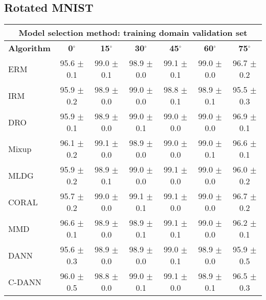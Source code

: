 \documentclass{article}
\begin{document}
\subsection{Rotated MNIST}
\begin{center}
\begin{tabular}{lcccccc}
\toprule
\multicolumn{7}{c}{\textbf{Model selection method: training domain validation set}} \\
\midrule
\textbf{Algorithm}    & \textbf{0$^{\circ}$}      & \textbf{15$^{\circ}$}     & \textbf{30$^{\circ}$}     & \textbf{45$^{\circ}$}     & \textbf{60$^{\circ}$}     & \textbf{75$^{\circ}$}     \\
\midrule
ERM                       & 95.6 $\pm$ 0.1            & 99.0 $\pm$ 0.1            & 98.9 $\pm$ 0.0            & 99.1 $\pm$ 0.1            & 99.0 $\pm$ 0.0            & 96.7 $\pm$ 0.2            \\
IRM                       & 95.9 $\pm$ 0.2            & 98.9 $\pm$ 0.0            & 99.0 $\pm$ 0.0            & 98.8 $\pm$ 0.1            & 98.9 $\pm$ 0.1            & 95.5 $\pm$ 0.3            \\
DRO                 & 95.9 $\pm$ 0.1            & 98.9 $\pm$ 0.0            & 99.0 $\pm$ 0.1            & 99.0 $\pm$ 0.0            & 99.0 $\pm$ 0.0            & 96.9 $\pm$ 0.1            \\
Mixup                     & 96.1 $\pm$ 0.2            & 99.1 $\pm$ 0.0            & 98.9 $\pm$ 0.0            & 99.0 $\pm$ 0.0            & 99.0 $\pm$ 0.1            & 96.6 $\pm$ 0.1            \\
MLDG                      & 95.9 $\pm$ 0.2            & 98.9 $\pm$ 0.1            & 99.0 $\pm$ 0.0            & 99.1 $\pm$ 0.0            & 99.0 $\pm$ 0.0            & 96.0 $\pm$ 0.2            \\
CORAL                     & 95.7 $\pm$ 0.2            & 99.0 $\pm$ 0.0            & 99.1 $\pm$ 0.1            & 99.1 $\pm$ 0.0            & 99.0 $\pm$ 0.0            & 96.7 $\pm$ 0.2            \\
MMD                       & 96.6 $\pm$ 0.1            & 98.9 $\pm$ 0.0            & 98.9 $\pm$ 0.1            & 99.1 $\pm$ 0.1            & 99.0 $\pm$ 0.0            & 96.2 $\pm$ 0.1            \\
DANN                       & 95.6 $\pm$ 0.3            & 98.9 $\pm$ 0.0            & 98.9 $\pm$ 0.0            & 99.0 $\pm$ 0.1            & 98.9 $\pm$ 0.0            & 95.9 $\pm$ 0.5            \\
C-DANN                   & 96.0 $\pm$ 0.5            & 98.8 $\pm$ 0.0            & 99.0 $\pm$ 0.1            & 99.1 $\pm$ 0.0            & 98.9 $\pm$ 0.1            & 96.5 $\pm$ 0.3            \\
\bottomrule
\end{tabular}
\end{center}
\end{document}
